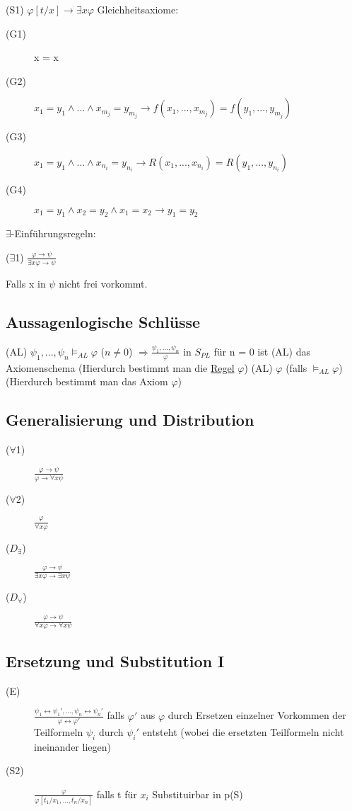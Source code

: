 \documentclass[12pt,a4paper]{article} %
\begin{document}
	(S1) $\varphi[t/x] \rightarrow \exists x \varphi$
	\newline	
	Gleichheitsaxiome:
	
	\begin{description}
		\item[(G1)] x = x
		\item[(G2)] $x_1 = y_1 \land ... \land x_{m_j} = y_{m_j} \rightarrow f(x_1, ..., x_{m_j}) = f(y_1, ..., y_{m_j})$
		\item[(G3)] $x_1 = y_1 \land ... \land x_{n_i} = y_{n_i} \rightarrow R(x_1, ..., x_{n_i}) = R(y_1, ..., y_{n_i})$
		\item[(G4)] $x_1 = y_1 \land x_2 = y_2 \land x_1 = x_2 \rightarrow y_1 = y_2$
	\end{description} 
	$\exists$-Einführungsregeln:
	
	($\exists$1) $\frac{\varphi \rightarrow \psi}{\exists x \varphi \rightarrow \psi}$ 
	
	Falls x in $\psi$ nicht frei vorkommt. 

	\subsection{Aussagenlogische Schlüsse}
	(AL) $\psi_1, ..., \psi_n \vDash_{AL} \varphi$ ($n \ne 0$) $\Rightarrow \frac{\psi_1, ..., \psi_n}{\varphi}$ in $S_{PL}$ für n = 0 ist (AL) das Axiomenschema (Hierdurch bestimmt man die \hyperref[Kalkul]{Regel} $\varphi$)\newline
	(AL) $\varphi$ (falls $\vDash_{AL} \varphi$) (Hierdurch bestimmt man das Axiom $\varphi$)
	
	\subsection{Generalisierung und Distribution}
	\begin{description}
		\item[($\forall$1)] $\frac{\varphi \rightarrow \psi}{\varphi \rightarrow \forall x \psi}$
		\item[($\forall$2)] $\frac{\varphi}{\forall x \varphi}$
		\item[($D_{\exists}$)] $\frac{\varphi \rightarrow \psi}{\exists x \varphi \rightarrow \exists x \psi}$
		\item[($D_{\forall}$)] $\frac{\varphi \rightarrow \psi}{\forall x \varphi \rightarrow \forall x \psi}$
	\end{description}

	\subsection{Ersetzung und Substitution I}
	\begin{description}
		\item[(E)] $\frac{\psi_1 \leftrightarrow \psi_1', ..., \psi_n \leftrightarrow \psi_n'}{\varphi \leftrightarrow \varphi'}$ falls $\varphi'$ aus $\varphi$ durch Ersetzen einzelner Vorkommen der Teilformeln $\psi_i$ durch $\psi_i'$ entsteht (wobei die ersetzten Teilformeln nicht ineinander liegen)
		\item[(S2)] $\frac{\varphi}{\varphi[t_1/x_1, ..., t_n/x_n]}$ falls t für $x_i$ Substituirbar in p(S)
	\end{description}
\end{document}

